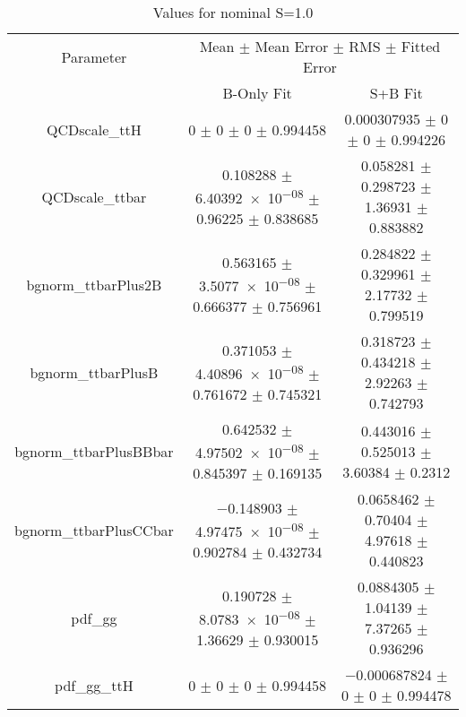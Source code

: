 \begin{table}
\centering
\caption{Values for nominal S=1.0}
\begin{tabular}{ccc}
\toprule
Parameter & \multicolumn{2}{c}{Mean $\pm$ Mean Error $\pm$ RMS $\pm$ Fitted Error}\\
 & B-Only Fit & S+B Fit\\
\midrule
QCDscale\_ttH & \num{0} $\pm$ \num{0} $\pm$ \num{0} $\pm$ \num{0.994458} & \num{0.000307935} $\pm$ \num{0} $\pm$ \num{0} $\pm$ \num{0.994226}\\
QCDscale\_ttbar & \num{0.108288} $\pm$ \num{6.40392e-08} $\pm$ \num{0.96225} $\pm$ \num{0.838685} & \num{0.058281} $\pm$ \num{0.298723} $\pm$ \num{1.36931} $\pm$ \num{0.883882}\\
bgnorm\_ttbarPlus2B & \num{0.563165} $\pm$ \num{3.5077e-08} $\pm$ \num{0.666377} $\pm$ \num{0.756961} & \num{0.284822} $\pm$ \num{0.329961} $\pm$ \num{2.17732} $\pm$ \num{0.799519}\\
bgnorm\_ttbarPlusB & \num{0.371053} $\pm$ \num{4.40896e-08} $\pm$ \num{0.761672} $\pm$ \num{0.745321} & \num{0.318723} $\pm$ \num{0.434218} $\pm$ \num{2.92263} $\pm$ \num{0.742793}\\
bgnorm\_ttbarPlusBBbar & \num{0.642532} $\pm$ \num{4.97502e-08} $\pm$ \num{0.845397} $\pm$ \num{0.169135} & \num{0.443016} $\pm$ \num{0.525013} $\pm$ \num{3.60384} $\pm$ \num{0.2312}\\
bgnorm\_ttbarPlusCCbar & \num{-0.148903} $\pm$ \num{4.97475e-08} $\pm$ \num{0.902784} $\pm$ \num{0.432734} & \num{0.0658462} $\pm$ \num{0.70404} $\pm$ \num{4.97618} $\pm$ \num{0.440823}\\
pdf\_gg & \num{0.190728} $\pm$ \num{8.0783e-08} $\pm$ \num{1.36629} $\pm$ \num{0.930015} & \num{0.0884305} $\pm$ \num{1.04139} $\pm$ \num{7.37265} $\pm$ \num{0.936296}\\
pdf\_gg\_ttH & \num{0} $\pm$ \num{0} $\pm$ \num{0} $\pm$ \num{0.994458} & \num{-0.000687824} $\pm$ \num{0} $\pm$ \num{0} $\pm$ \num{0.994478}\\
\bottomrule
\end{tabular}
\end{table}